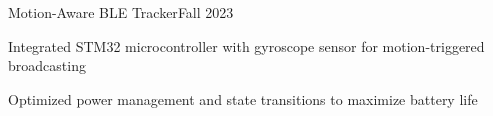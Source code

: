 \begin{joblong}{Motion-Aware BLE Tracker}{Fall 2023}
	\item Integrated STM32 microcontroller with gyroscope sensor for motion-triggered broadcasting
	\item Optimized power management and state transitions to maximize battery life
\end{joblong}

